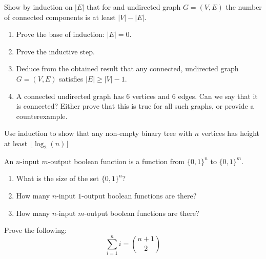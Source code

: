 \documentclass[11pt]{article}
\newcommand{\zo}{\{0,1\}}
\begin{document}
    \newpage
    
    
    \begin{tcolorbox}[title={Problem 2C (Graphs, B.4-3)}]
       Show by induction on $|E|$ that for and undirected graph $G=(V,E)$ the number of connected components is at least $|V| - |E|$.
       \begin{enumerate}
           \item Prove the base of induction: $|E|=0$.
           \item Prove the inductive step.
           \item Deduce from the obtained result that any connected, undirected graph $G=(V,E)$ satisfies $|E|\ge |V|-1$.
           \item A connected undirected graph has 6 vertices and 6 edges. Can we say that it is connected? Either prove that this is true for all such graphs, or provide a counterexample.
       \end{enumerate}
    \end{tcolorbox}
    
    \newpage
    
    \begin{tcolorbox}[title={Problem 2D (Trees, B.5-5)}]
       Use induction to show that any non-empty binary tree with $n$ vertices has height at least $\lfloor \log_2(n) \rfloor$
    \end{tcolorbox}
    
    \newpage
    
    \begin{tcolorbox}[title={Problem 3A (Counting, C.1-2)}]
       An $n$-input $m$-output boolean function is a function from $\zo^n$ to $\zo^m$. 
       \begin{enumerate}
            \item What is the size of the set $\zo^n$?
           \item How many $n$-input $1$-output boolean functions are there?
           \item How many $n$-input $m$-output boolean functions are there?
       \end{enumerate}

    \end{tcolorbox}
    
    \newpage
    
    \begin{tcolorbox}[title={Problem 3B (Counting, C.1-9)}]
       Prove the following:
       \[ \sum_{i=1}^n i = \binom{n+1}{2}\]
    \end{tcolorbox}
    
\end{document}
